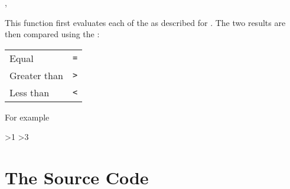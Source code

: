 \documentclass[oneside]{book}
\begin{document}
\begin{function}{\IntCompare,\IntCompareTF}
\begin{syntax}
   
     
\end{syntax}
This function first evaluates each of the 
as described for . The two results are then
compared using the :\par
{\centering\begin{tabular}{ll}
Equal        & \texttt{=} \\
Greater than & \texttt{>} \\
Less than    & \texttt{<} \\
\end{tabular}\par}
For example
\begin{demohigh}
>{1}{}{}
>{3}{}{}
\end{demohigh}
\end{function}

\chapter{The Source Code}

\setlength\parskip{0pt}
\end{document}
